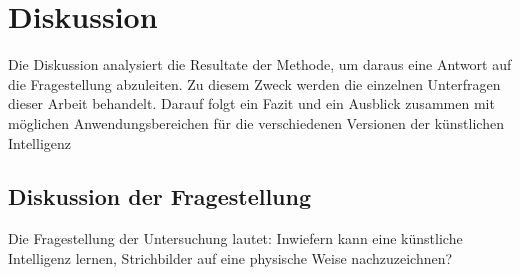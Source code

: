 \chapter{Diskussion}\label{chap:d} 
Die Diskussion analysiert die Resultate der Methode, um daraus eine Antwort auf
die Fragestellung abzuleiten. Zu diesem Zweck werden die einzelnen Unterfragen
dieser Arbeit behandelt. Darauf folgt ein Fazit und ein Ausblick zusammen mit
möglichen Anwendungsbereichen für die verschiedenen Versionen der künstlichen
Intelligenz

\section{Diskussion der Fragestellung}\label{chap:d_frage}
Die Fragestellung der Untersuchung lautet: Inwiefern kann eine künstliche
Intelligenz lernen, Strichbilder auf eine physische Weise nachzuzeichnen?






